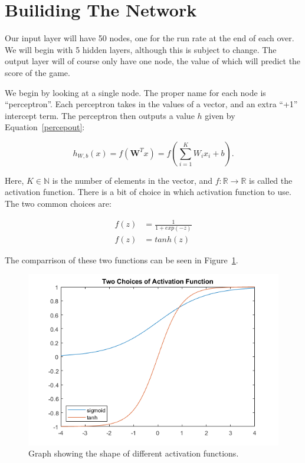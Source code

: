 \section{Builiding The Network}
Our input layer will have 50 nodes, one for the run rate at the end of each over. We will begin with 5 hidden layers, although this is subject to change. The output layer
will of course only have one node, the value of which will predict the score of the game. 

We begin by looking at a single node. The proper name for each node is ``perceptron''. Each perceptron takes in the values of a vector, and an extra ``+1'' intercept term. The perceptron then outputs a value $h$ given by Equation~\ref{percepout}:

\begin{equation}
    \label{percepout}
    h_{W,b}(x) = f(\textbf{W}^Tx) = f(\sum_{i=1}^KW_ix_i+b).
\end{equation}

Here, $K \in \mathbb{N}$ is the number of elements in the vector, and $f:\mathbb{R} \rightarrow \mathbb{R}$ is called the activation function. There is a bit of choice in which activation function to use.
The two common choices are:

\begin{align}
    \label{sigmoid_func}
    f(z) &= \frac{1}{1+exp(-z)} \\
    f(z) &= tanh(z)
\end{align}

The comparrison of these two functions can be seen in Figure~\ref{actfig}.

\begin{figure}[h]
    \centering
    \includegraphics[scale=0.5]{figures/actfuncs.png}
    \caption{Graph showing the shape of different activation functions.}
    \label{actfig}
\end{figure}

